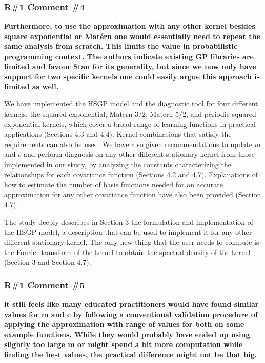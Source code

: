 \documentclass[11pt]{report}
\begin{document}
\subsubsection*{R\#1 Comment \#4}

\textbf{Furthermore, to use the approximation with any other kernel besides square exponential or Matérn one would essentially need to repeat the same analysis from scratch. This limits the value in probabilistic programming context. The authors indicate existing GP  libraries are limited and favour Stan for its generality, but since we now only have support for two specific kernels one could easily argue this approach is limited as well.}

We have implemented the HSGP model and the diagnostic tool for four different kernels, the squared exponential, Matern-3/2, Matern-5/2, and periodic squared exponential kernels, which cover a broad range of learning functions in practical applications (Sections 4.3 and 4.4). Kernel combinations that satisfy the requirements can also be used. We have also given recommendations to update $m$ and $c$ and perform diagnosis on any other different stationary kernel from those implemented in our study, by analyzing the constants characterizing the relationships for each covariance function (Sections 4.2 and 4.7). Explanations of how to estimate the number of basis functions needed for an accurate approximation for any other covariance function have also been provided (Section 4.7).

The study deeply describes in Section 3 the formulation and implementation of the HSGP model, a description that can be used to implement it for any other different stationary kernel. The only new thing that the user needs to compute is the Fourier transform of the kernel to obtain the spectral density of the kernel (Section 3 and Section 4.7).

\subsubsection*{R\#1 Comment \#5}

\textbf{it still feels like many educated practitioners would have found similar values for m and c by following a conventional validation procedure of applying the approximation with range of values for both on some example functions. While they would probably have ended up using slightly too large m or might spend a bit more computation while finding the best values, the practical difference might not be that big.}
\end{document}
